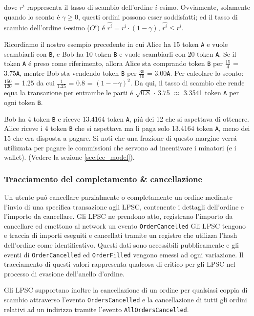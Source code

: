 \documentclass[UTF8,nofonts]{article}
\begin{document}
\begin{multicols}{2}
dove $r^i$ rappresenta il tasso di scambio dell'ordine $i$-esimo. Ovviamente, solamente quando lo sconto \'e $\gamma \ge 0$, questi ordini possono esser soddisfatti; ed il tasso di scambio dell'ordine $i$-esimo  ($O^i$) \'e $\hat{r^i} = r^i \cdot (1-\gamma)$, $\hat{r^i}\le r^i$.

Ricordiamo il nostro esempio precedente in cui Alice ha 15 token \verb|A| e vuole scambiarli con \verb|B|, e Bob ha 10 token \verb|B| e vuole scambiarli con 20 token \verb|A|. Se il token \verb|A| \'e preso come riferimento, allora Alice sta comprando token \verb|B| per $\frac{15}{4}$ = 3.75\verb|A|, mentre Bob sta vendendo token \verb|B| per $\frac{30}{10}$ = 3.00\verb|A|. Per calcolare lo sconto: $\frac{150}{120}$ = 1.25 da cui $\frac{1}{1.25}$ = 0.8 = $(1 −- \gamma)^2$. Da qui, il tasso di scambio che rende equa la transazione per entrambe le parti \'e $\sqrt{0.8}$ $\cdot$ 3.75 $\approx$ 3.3541 token \verb|A| per ogni token \verb|B|.

Bob ha 4 token \verb|B| e riceve 13.4164 token \verb|A|,  pi\'u dei 12 che si aspettava di ottenere. Alice riceve i 4 token \verb|B| che si aspettava ma li paga solo 13.4164 token \verb|A|, meno dei 15 che era disposta a pagare. Si noti che una frazione di questo margine verr\'a utilizzata per pagare le commissioni che servono ad incentivare i minatori (e i wallet). (Vedere la sezione  \ref{sec:fee_model}).


\subsubsection{Tracciamento del completamento \& cancellazione}

Un utente pu\'o cancellare parzialmente o completamente un ordine mediante l'invio di una specifica transazione agli LPSC, contenente i dettagli dell'ordine e l'importo da cancellare. Gli LPSC ne prendono atto, registrano l'importo da cancellare ed emettono al network un evento \verb|OrderCancelled| Gli LPSC tengono e traccia di importi eseguiti e cancellati tramite un registro che utilizza l'hash dell'ordine come identificativo. Questi dati sono accessibili pubblicamente e gli eventi di \verb|OrderCancelled| ed \verb|OrderFilled| vengono emessi ad ogni variazione. Il tracciamento di questi valori rappresenta qualcosa di critico per gli LPSC nel processo di evasione dell'anello d'ordine.

Gli LPSC supportano inoltre la cancellazione di un ordine per qualsiasi coppia di scambio attraverso l'evento \verb|OrdersCancelled| e la cancellazione di tutti gli ordini relativi ad un indirizzo tramite l'evento \verb|AllOrdersCancelled|.



\end{multicols}
\end{document}
